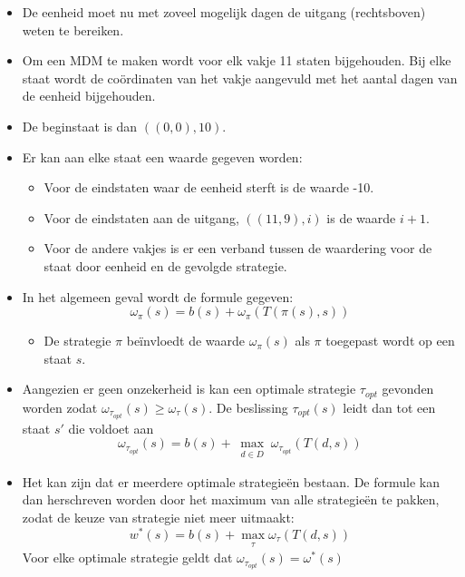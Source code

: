 \begin{itemize}
\begin{itemize}
		\item De eenheid moet nu met zoveel mogelijk dagen de uitgang (rechtsboven) weten te bereiken. 
		\item Om een MDM te maken wordt voor elk vakje 11 staten bijgehouden. Bij elke staat wordt de coördinaten van het vakje aangevuld met het aantal dagen van de eenheid bijgehouden.
		\item De beginstaat is dan $((0, 0), 10)$.
		\item Er kan aan elke staat een waarde gegeven worden:
		\begin{itemize}
			\item Voor de eindstaten waar de eenheid sterft is de waarde -10.
			\item Voor de eindstaten aan de uitgang, $((11, 9), i)$ is de waarde $i + 1$.
			\item Voor de andere vakjes is er een verband tussen de waardering voor de staat door eenheid en de gevolgde strategie.
		\end{itemize}
		\item In het algemeen geval wordt de formule gegeven:
		{\color{OliveGreen}	$$\omega_\pi(s) = b(s) + \omega_\pi(T(\pi(s), s))$$}
		\begin{itemize}
			\item De strategie $\pi$ beïnvloedt de waarde $\omega_\pi(s)$ als $\pi$ toegepast wordt op een staat $s$.
		\end{itemize}
		\item Aangezien er geen onzekerheid is kan een optimale strategie $\tau_{opt}$ gevonden worden zodat $\omega_{\tau_{opt}}(s) \geq \omega_\tau(s)$. De beslissing $\tau_{opt}(s)$ leidt dan tot een staat $s'$ die voldoet aan
		{\color{OliveGreen}		
		$$\omega_{\tau_{opt}}(s) = b(s) + \max_{\substack{d \in D}} \omega_{\tau_{opt}}(T(d,s))$$
		}
	\item Het kan zijn dat er meerdere optimale strategieën bestaan. De formule kan dan herschreven worden door het maximum van alle strategieën te pakken, zodat de keuze van strategie niet meer uitmaakt:
		{\color{OliveGreen}		
		$$w^*(s) = b(s) + \max_{\substack{\tau}}\omega_\tau(T(d, s))$$
	}
	Voor elke optimale strategie geldt dat $\omega_{\tau_{opt}}(s) = \omega^*(s) $
	\end{itemize}
\end{itemize}

